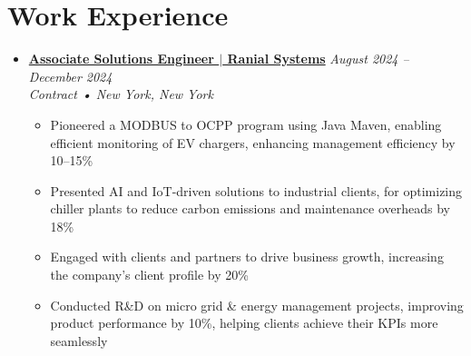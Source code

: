 \documentclass[letterpaper,11pt]{article}
\begin{document}
\section{Work Experience}
\begin{itemize}[leftmargin=0mm, label={}, itemsep=1pt]  %

  \item \textbf{\href{https://www.ranial.com}{Associate Solutions Engineer $|$ Ranial Systems}} \hfill \textit{\small August 2024 -- December 2024} \\
  \small \textit{Contract • New York, New York} \vspace{-0.1\baselineskip}  %
  \begin{itemize}[leftmargin=5mm, itemsep=0pt, topsep=0pt]  %
    \item \small Pioneered a MODBUS to OCPP program using Java Maven, enabling efficient monitoring of EV chargers, enhancing management efficiency by 10--15\%
    \item \small Presented AI and IoT-driven solutions to industrial clients, for optimizing chiller plants to reduce carbon emissions and maintenance overheads by 18\%
    \item \small Engaged with clients and partners to drive business growth, increasing the company’s client profile by 20\%
    \item \small Conducted R\&D on micro grid \& energy management projects, improving product performance by 10\%, helping clients achieve their KPIs more seamlessly 
  \end{itemize}


\end{itemize}
\end{document}
